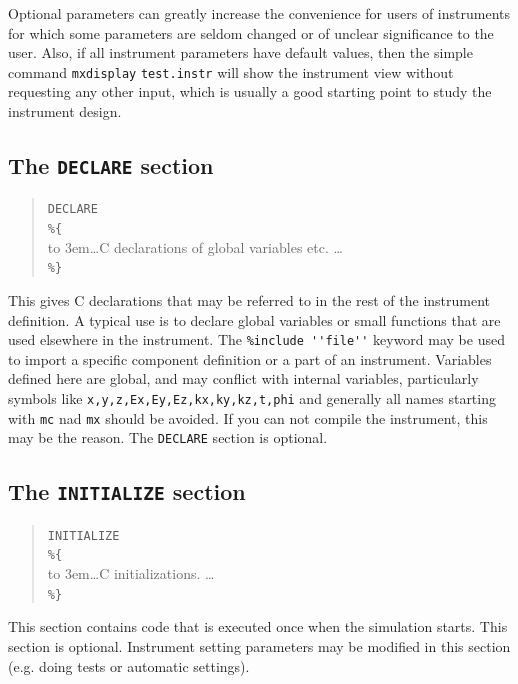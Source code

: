 Optional parameters can greatly increase the convenience for users of
instruments for which some parameters are seldom changed or of unclear significance to the user. Also, if all instrument parameters have default values, then the simple command \verb+mxdisplay+ \verb+test.instr+ will show the instrument view without requesting any other input, which is usually a good starting point to study the instrument design.

\subsection{The \texttt{DECLARE} section}
\label{s:declare}

\begin{quote}
  \texttt{DECLARE} \\
  \verb|%{| \\
  \hbox to 3em{}\ldots C declarations of global variables etc. \ldots \\
  \verb|%}|
\end{quote} 
This gives C declarations that may be referred to in the rest of the
instrument definition. A typical use is to declare global variables or
small functions that are used elsewhere in the instrument. The \verb+%include ''file''+ keyword may be used to import a specific
component definition or a part of an instrument. Variables defined here are global, and may conflict with internal \MCX variables, particularly symbols like
\verb+x,y,z,Ex,Ey,Ez,kx,ky,kz,t,phi+ and generally all names starting with \verb+mc+ nad \verb+mx+ should be avoided. If you can not compile the instrument, this may be the reason.
The \texttt{DECLARE} section is optional.

\subsection{The \texttt{INITIALIZE} section}
\label{s:initialize}

\begin{quote}
  \texttt{INITIALIZE} \\
  \verb|%{| \\
  \hbox to 3em{}\ldots C initializations. \ldots \\
  \verb|%}|
\end{quote} 
This section contains code that is executed once when the simulation starts. This section is
optional. Instrument setting parameters may be modified in this section (e.g. doing tests or automatic settings).

